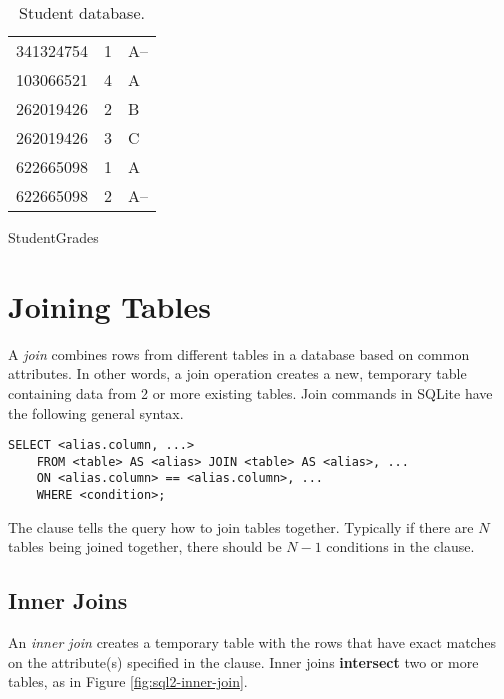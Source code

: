 \begin{table}[H]
\begin{subtable}{.35\textwidth}
\begin{tabular}{|l|l|l|}
        341324754 & 1 & A-- \\
        103066521 & 4 & A \\
        262019426 & 2 & B \\
        262019426 & 3 & C \\
        622665098 & 1 & A \\
        622665098 & 2 & A-- \\ \hline
    \end{tabular}
    \caption{StudentGrades}
    \label{table:sql2-student-grades}
\end{subtable}
\caption{Student database.}
\end{table}

\section*{Joining Tables} %

A \emph{join} combines rows from different tables in a database based on common attributes.
In other words, a join operation creates a new, temporary table containing data from 2 or more existing tables.
Join commands in SQLite have the following general syntax.
\begin{lstlisting}
SELECT <alias.column, ...>
    FROM <table> AS <alias> JOIN <table> AS <alias>, ...
    ON <alias.column> == <alias.column>, ...
    WHERE <condition>;
\end{lstlisting}

The  clause tells the query how to join tables together.
Typically if there are $N$ tables being joined together, there should be $N-1$ conditions in the  clause.

\subsection*{Inner Joins} %

An \emph{inner join} creates a temporary table with the rows that have exact matches on the attribute(s) specified in the  clause.
Inner joins \textbf{intersect} two or more tables, as in Figure \ref{fig:sql2-inner-join}.

